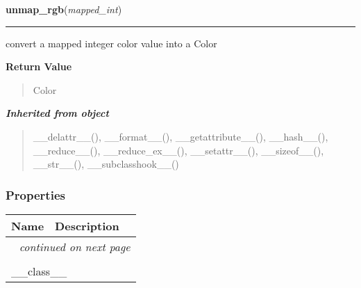 \hspace{.8\funcindent}\begin{boxedminipage}{\funcwidth}

    \raggedright \textbf{unmap\_rgb}(\textit{mapped\_int})

    \vspace{-1.5ex}

    \rule{\textwidth}{0.5\fboxrule}
\setlength{\parskip}{2ex}
    convert a mapped integer color value into a Color

\setlength{\parskip}{1ex}
      \textbf{Return Value}
    \vspace{-1ex}

      \begin{quote}
      Color

      \end{quote}

    \end{boxedminipage}


\large{\textbf{\textit{Inherited from object}}}

\begin{quote}
\_\_delattr\_\_(), \_\_format\_\_(), \_\_getattribute\_\_(), \_\_hash\_\_(), \_\_reduce\_\_(), \_\_reduce\_ex\_\_(), \_\_setattr\_\_(), \_\_sizeof\_\_(), \_\_str\_\_(), \_\_subclasshook\_\_()
\end{quote}


  \subsubsection{Properties}

    \vspace{-1cm}
\hspace{\varindent}\begin{longtable}{|p{\varnamewidth}|p{\vardescrwidth}|l}
\cline{1-2}
\cline{1-2} \centering \textbf{Name} & \centering \textbf{Description}& \\
\cline{1-2}
\endhead\cline{1-2}\multicolumn{3}{r}{\small\textit{continued on next page}}\\\endfoot\cline{1-2}
\endlastfoot\multicolumn{2}{|l|}{\textit{Inherited from object}}\\
\multicolumn{2}{|p{\varwidth}|}{\raggedright \_\_class\_\_}\\
\cline{1-2}
\end{longtable}

